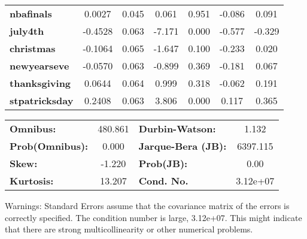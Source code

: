 \begin{center}
\begin{tabular}{lcccccc}
\textbf{nbafinals}                         &       0.0027  &        0.045     &     0.061  &         0.951        &       -0.086    &        0.091     \\
\textbf{july4th}                           &      -0.4528  &        0.063     &    -7.171  &         0.000        &       -0.577    &       -0.329     \\
\textbf{christmas}                         &      -0.1064  &        0.065     &    -1.647  &         0.100        &       -0.233    &        0.020     \\
\textbf{newyearseve}                       &      -0.0570  &        0.063     &    -0.899  &         0.369        &       -0.181    &        0.067     \\
\textbf{thanksgiving}                      &       0.0644  &        0.064     &     0.999  &         0.318        &       -0.062    &        0.191     \\
\textbf{stpatricksday}                     &       0.2408  &        0.063     &     3.806  &         0.000        &        0.117    &        0.365     \\
\bottomrule
\end{tabular}
\begin{tabular}{lclc}
\textbf{Omnibus:}       & 480.861 & \textbf{  Durbin-Watson:     } &    1.132  \\
\textbf{Prob(Omnibus):} &   0.000 & \textbf{  Jarque-Bera (JB):  } & 6397.115  \\
\textbf{Skew:}          &  -1.220 & \textbf{  Prob(JB):          } &     0.00  \\
\textbf{Kurtosis:}      &  13.207 & \textbf{  Cond. No.          } & 3.12e+07  \\
\bottomrule
\end{tabular}
\end{center}

Warnings: \newline
 [1] Standard Errors assume that the covariance matrix of the errors is correctly specified. \newline
 [2] The condition number is large, 3.12e+07. This might indicate that there are \newline
 strong multicollinearity or other numerical problems.